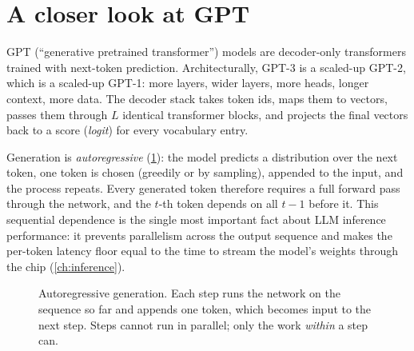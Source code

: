 \section{A closer look at GPT}\label{sec:landscape:gpt}

GPT (``generative pretrained transformer'') models are decoder-only transformers trained with next-token
prediction. Architecturally, GPT-3 is a scaled-up GPT-2, which is a scaled-up GPT-1: more layers, wider
layers, more heads, longer context, more data. The decoder stack takes token ids, maps them to vectors,
passes them through $L$ identical transformer blocks, and projects the final vectors back to a score
(\emph{logit}) for every vocabulary entry.

Generation is \emph{autoregressive} (\cref{fig:landscape:autoregressive}): the model predicts a
distribution over the next token, one token is chosen (greedily or by sampling), appended to the input,
and the process repeats. Every generated token therefore requires a full forward pass through the
network, and the $t$-th token depends on all $t-1$ before it. This sequential dependence is the single
most important fact about LLM inference performance: it prevents parallelism across the output
sequence and makes the per-token latency floor equal to the time to stream the model's weights through
the chip (\cref{ch:inference}).

\begin{figure}[t]
\centering
{}
\caption{Autoregressive generation. Each step runs the network on the sequence so far and appends one
token, which becomes input to the next step. Steps cannot run in parallel; only the work \emph{within}
a step can.}
\label{fig:landscape:autoregressive}
\end{figure}

